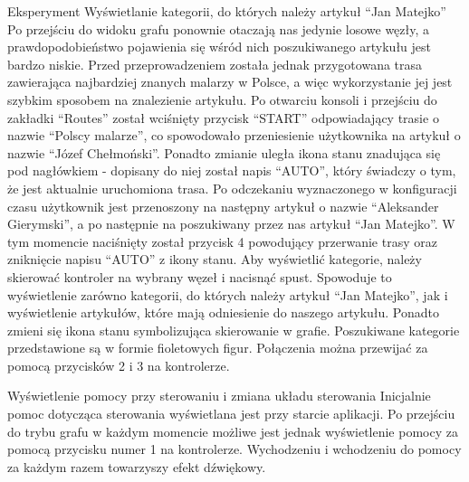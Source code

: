 \begin{chapter}{Eksperyment}
Wyświetlanie kategorii, do których należy artykuł “Jan Matejko”
Po przejściu do widoku grafu ponownie otaczają nas jedynie losowe węzły, a prawdopodobieństwo pojawienia się wśród nich poszukiwanego artykułu jest bardzo niskie. Przed przeprowadzeniem została jednak przygotowana trasa zawierająca najbardziej znanych malarzy w Polsce, a więc wykorzystanie jej jest szybkim sposobem na znalezienie artykułu. Po otwarciu konsoli i przejściu do zakładki “Routes” został wciśnięty przycisk “START” odpowiadający trasie o nazwie “Polscy malarze”, co spowodowało przeniesienie użytkownika na artykuł o nazwie “Józef Chełmoński”. Ponadto zmianie uległa ikona stanu znadująca się pod nagłówkiem - dopisany do niej został napis “AUTO”, który świadczy o tym, że jest aktualnie uruchomiona trasa.  Po odczekaniu wyznaczonego w konfiguracji czasu użytkownik jest przenoszony na następny artykuł o nazwie “Aleksander Gierymski”, a po następnie na poszukiwany przez nas artykuł “Jan Matejko”. W tym momencie naciśnięty został przycisk 4 powodujący przerwanie trasy oraz zniknięcie napisu “AUTO” z ikony stanu. Aby wyświetlić kategorie, należy skierować kontroler na wybrany węzeł i nacisnąć spust. Spowoduje to wyświetlenie zarówno kategorii, do których należy artykuł “Jan Matejko”, jak i wyświetlenie artykułów, które mają odniesienie do naszego artykułu. Ponadto zmieni się ikona stanu symbolizująca skierowanie w grafie. Poszukiwane kategorie przedstawione są w formie fioletowych figur. Połączenia można przewijać za pomocą przycisków 2 i 3 na kontrolerze.

Wyświetlenie pomocy przy sterowaniu i zmiana układu sterowania
Inicjalnie pomoc dotycząca sterowania wyświetlana jest przy starcie aplikacji. Po przejściu do trybu grafu w każdym momencie możliwe jest jednak wyświetlenie pomocy za pomocą przycisku numer 1 na kontrolerze. Wychodzeniu i wchodzeniu do pomocy za każdym razem towarzyszy efekt dźwiękowy.


\end{chapter}

